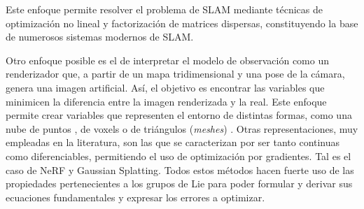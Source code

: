 Este enfoque permite resolver el problema de SLAM mediante técnicas de optimización no lineal y factorización de matrices dispersas, constituyendo la base de numerosos sistemas modernos de SLAM.

Otro enfoque posible es el de interpretar el modelo de observación como un renderizador que, a partir de un mapa tridimensional y una pose de la cámara, genera una imagen artificial. Así, el objetivo es encontrar las variables que minimicen la diferencia entre la imagen renderizada y la real. Este enfoque permite crear variables que representen el entorno de distintas formas, como una nube de puntos \cite{Sandström2023ICCV}, de voxels \cite{liu2024voxelslamcompleteaccurateversatile} o de triángulos (\textit{meshes}) \cite{10161425}. Otras representaciones, muy empleadas en la literatura, son las que se caracterizan por ser tanto continuas como diferenciables, permitiendo el uso de optimización por gradientes. Tal es el caso de NeRF y Gaussian Splatting. Todos estos métodos hacen fuerte uso de las propiedades pertenecientes a los grupos de Lie para poder formular y derivar sus ecuaciones fundamentales y expresar los errores a optimizar.
